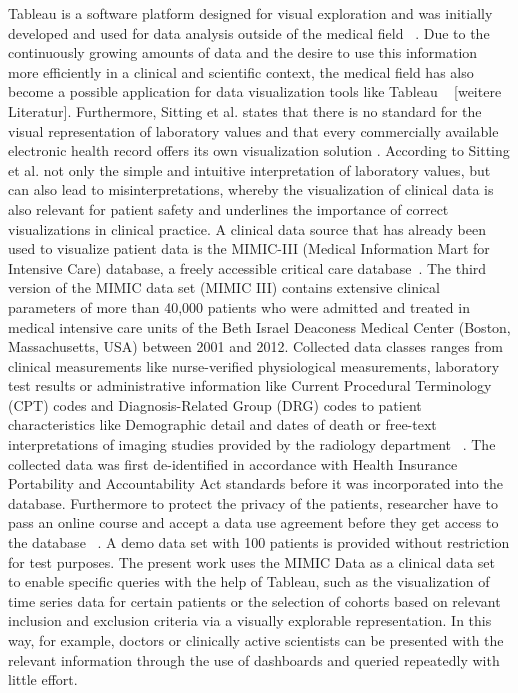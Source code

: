 Tableau is a software platform designed for visual exploration and was initially developed and used for data analysis outside of the medical field ~\cite{Tableau.2021}. Due to the continuously growing amounts of data and the desire to use this information more efficiently in a clinical and scientific context, the medical field has also become a possible application for data visualization tools like Tableau ~\cite{Ko.2017} [weitere Literatur]. 
Furthermore, Sitting et al. states that there is no standard for the visual representation of laboratory values and that every commercially available electronic health record offers its own visualization solution \cite{Sittig.2015}. According to Sitting et al. not only the simple and intuitive interpretation of laboratory values, but can also lead to misinterpretations, whereby the visualization of clinical data is also relevant for patient safety and underlines the importance of correct visualizations in clinical practice.
A clinical data source that has already been used to visualize patient data is the MIMIC-III (Medical Information Mart for Intensive Care) database, a freely accessible critical care database~\cite{Festag.2019,Lee.2016,Johnson.2020,Johnson.2016}. The third version of the MIMIC data set (MIMIC III) contains extensive clinical parameters of more than 40,000 patients who were admitted and treated in medical intensive care units of the Beth Israel Deaconess Medical Center (Boston, Massachusetts, USA) between 2001 and 2012. Collected data classes ranges from clinical measurements like nurse-verified physiological measurements, laboratory test results or administrative information like Current Procedural Terminology (CPT) codes and Diagnosis-Related Group (DRG) codes to patient characteristics like Demographic detail and dates of death or free-text interpretations of imaging studies provided by the radiology department ~\cite{Johnson.2020,Johnson.2016}. The collected data was first de-identified in accordance with Health Insurance Portability and Accountability Act standards before it was incorporated into the database. Furthermore to protect the privacy of the patients, researcher have to pass an online course and accept a data use agreement before they get access to the database ~\cite{Johnson.2020,Johnson.2016}. A demo data set with 100 patients is provided without restriction for test purposes. 
The present work uses the MIMIC Data as a clinical data set to enable specific queries with the help of Tableau, such as the visualization of time series data for certain patients or the selection of cohorts based on relevant inclusion and exclusion criteria via a visually explorable representation. In this way, for example, doctors or clinically active scientists can be presented with the relevant information through the use of dashboards and queried repeatedly with little effort.